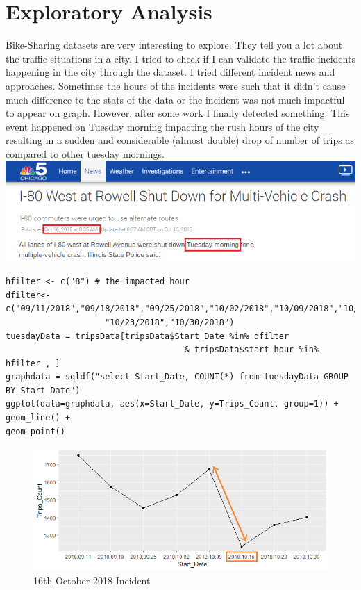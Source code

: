 \documentclass[11pt]{article}
\begin{document}
\section{Exploratory Analysis}
Bike-Sharing datasets are very interesting to explore. They tell you a lot about the traffic situations in a city. I tried to check if I can validate the traffic incidents happening in the city through the dataset. I tried different incident news and approaches. Sometimes the hours of the incidents were such that it didn't cause much difference to the stats of the data or the incident was not much impactful to appear on graph. However, after some work I finally detected something. This event happened on Tuesday morning impacting the rush hours of the city resulting in  a sudden and considerable (almost double) drop of number of trips as compared to other tuesday mornings.\newline\newline
\includegraphics[width=1\linewidth]{nbcc.png}\newline
\begin{lstlisting}
hfilter <- c("8") # the impacted hour
dfilter<- c("09/11/2018","09/18/2018","09/25/2018","10/02/2018","10/09/2018","10/16/2018",
					"10/23/2018","10/30/2018")
tuesdayData = tripsData[tripsData$Start_Date %in% dfilter 
									& tripsData$start_hour %in% hfilter , ]
graphdata = sqldf("select Start_Date, COUNT(*) from tuesdayData GROUP BY Start_Date")
ggplot(data=graphdata, aes(x=Start_Date, y=Trips_Count, group=1)) + 
geom_line() + 
geom_point()
\end{lstlisting}
\begin{figure}[h!]
  \includegraphics[width=1\linewidth]{plot.png}
  \caption{16th October 2018 Incident}
\end{figure}
\end{document}
